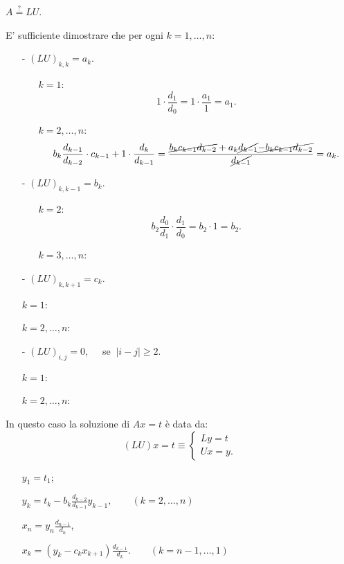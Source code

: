 \begin{dimo}$A \stackrel{?}{=} LU$.

E' sufficiente dimostrare che per ogni $k = 1, \ldots, n$:
\begin{itemize}
\item[-]$(LU)_{k,k} = a_k$.
  \begin{itemize}
  \item[]$k = 1$:\[ 1\cdot \frac{d_1}{d_0}=1\cdot \frac{a_1}{1} = a_1.\]
  \item[]$k = 2, \ldots, n$:
    \[
    b_k\frac{d_{k-1}}{d_{k-2}}\cdot c_{k-1} + 1 \cdot \frac{d_k}{d_{k-1}} =
    \frac{\cancel{b_kc_{k-1}d_{k-2}} + a_k\cancel{d_{k-1}}
    \cancel{- b_kc_{k-1}d_{k-2}}}{\cancel{d_{k-1}}} = a_k.
    \]
  \end{itemize}
\item[-]$(LU)_{k,k-1} = b_{k}$.
  \begin{itemize}
  \item[]$k = 2$:\[b_2\frac{d_0}{d_1}\cdot\frac{d_1}{d_0} = b_2\cdot 1 = b_2.\]
  \item[]$k = 3, \ldots, n$:
    \[
    \]
  \end{itemize}
\item[-]$(LU)_{k,k+1} = c_k$.
  \item[]$k = 1$:\[\]
  \item[]$k = 2, \ldots, n$:
    \[
    \]
\item[-]$(LU)_{i,j} = 0,\quad$ se $\ |i-j| \geq 2$.
  \item[]$k = 1$:\[\]
  \item[]$k = 2, \ldots, n$:
    \[
    \]
\end{itemize}

\end{dimo}

In questo caso la soluzione di $Ax = t$ è data da:
\[(LU)x = t \equiv \left\{
\begin{array}{l}
Ly = t \\
Ux = y.
\end{array}\right.\]
\begin{itemize}
\item[]$y_1 = t_1$;
\item[]$y_k = t_k - b_k \frac{d_{k-2}}{d_{k-1}}y_{k-1}, \qquad(k = 2,\ldots, n)$
\item[]$x_n = y_n\frac{d_{n-1}}{d_n}$,
\item[]$x_k = (y_k - c_kx_{k+1})\frac{d_{k-1}}{d_k}. \qquad(k = n-1, \ldots, 1)$
\end{itemize}

